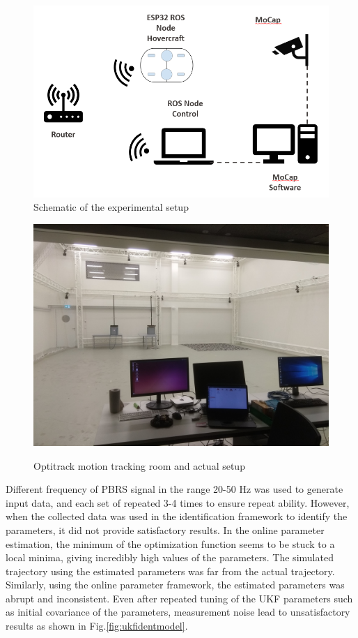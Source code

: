\documentclass[12pt,titlepage]{article}
\begin{document}
\begin{figure}[H]
\begin{minipage}{.5\textwidth}
  \centering
    \includegraphics[width=0.9\columnwidth]{Images/experimental_setup.PNG}\\
    \caption{Schematic of the experimental setup}
    \label{fig:schematic_opti}
    \end{minipage}%
\begin{minipage}{.5\textwidth}
  \centering
    \includegraphics[width=0.9\columnwidth]{Images/experimental_setup.jpg}\\
    \caption{Optitrack motion tracking room and actual setup}
    \label{fig:exper_setup_opti}
    \end{minipage}%
\end{figure}
Different frequency of PBRS signal in the range 20-50 Hz was used to generate input data, and each set of repeated 3-4 times to ensure repeat ability. However, when the collected data was used in the identification framework to identify the parameters, it did not provide satisfactory results. In the online parameter estimation, the minimum of the optimization function seems to be stuck to a local minima, giving incredibly high values of the parameters. The simulated trajectory using the estimated parameters was far from the actual trajectory. Similarly, using the online parameter framework, the estimated parameters was abrupt and inconsistent. Even after repeated tuning of the UKF parameters such as initial covariance of the parameters, measurement noise lead to unsatisfactory results as shown in Fig.\ref{fig:ukfidentmodel}.
\end{document}
